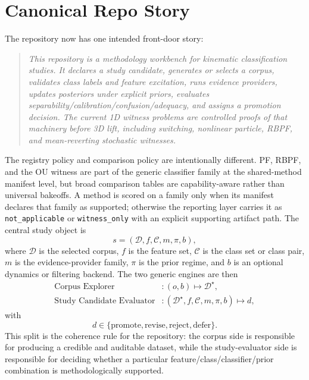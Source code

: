 \documentclass[11pt]{article}
\begin{document}
\section{Canonical Repo Story}
The repository now has one intended front-door story:
\begin{quote}
\textit{This repository is a methodology workbench for kinematic classification studies. It declares a study candidate, generates or selects a corpus, validates class labels and feature excitation, runs evidence providers, updates posteriors under explicit priors, evaluates separability/calibration/confusion/adequacy, and assigns a promotion decision. The current 1D witness problems are controlled proofs of that machinery before 3D lift, including switching, nonlinear particle, RBPF, and mean-reverting stochastic witnesses.}
\end{quote}
The registry policy and comparison policy are intentionally different. PF, RBPF, and the OU witness are part of the generic classifier family at the shared-method manifest level, but broad comparison tables are capability-aware rather than universal bakeoffs. A method is scored on a family only when its manifest declares that family as supported; otherwise the reporting layer carries it as \texttt{not\_applicable} or \texttt{witness\_only} with an explicit supporting artifact path.
The central study object is
\begin{equation}
s = (\mathcal{D}, f, \mathcal{C}, m, \pi, b),
\end{equation}
where \(\mathcal{D}\) is the selected corpus, \(f\) is the feature set, \(\mathcal{C}\) is the class set or class pair, \(m\) is the evidence-provider family, \(\pi\) is the prior regime, and \(b\) is an optional dynamics or filtering backend. The two generic engines are then
\begin{align}
\text{Corpus Explorer} &: (o, b) \mapsto \mathcal{D}^{\star}, \\
\text{Study Candidate Evaluator} &: (\mathcal{D}^{\star}, f, \mathcal{C}, m, \pi, b) \mapsto d,
\end{align}
with
\begin{equation}
d \in \{\text{promote}, \text{revise}, \text{reject}, \text{defer}\}.
\end{equation}
This split is the coherence rule for the repository: the corpus side is responsible for producing a credible and auditable dataset, while the study-evaluator side is responsible for deciding whether a particular feature/class/classifier/prior combination is methodologically supported.
\end{document}
